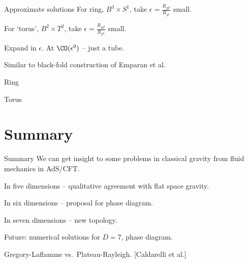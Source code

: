\documentclass{beamer}
\newcommand{\rref}[1]{\hfill \small{\color{darkgrey} [#1]}}
\begin{document}

\begin{frame}{Approximate solutions}
%
 For ring, $B^3 \times S^1$, take $\epsilon = \frac{R_{B^3}}{R_{S^1}}$ small.

 \vp For `torus', $B^2 \times T^2$, take $\epsilon = \frac{R_{B^2}}{R_{T^2}}$ small.

 \vp Expand in $\epsilon$. At $\CO(\epsilon^0)$ -- just a tube.

 \vp Similar to black-fold construction of Emparan et al.
%
\end{frame}


\begin{frame}{Ring}
%
 \begin{center}
   
 \end{center}
%
\end{frame}


\begin{frame}{Torus}
%
 \begin{center}
   
 \end{center}
%
\end{frame}

\section{Summary}


\begin{frame}{Summary}
%
 We can get insight to some problems in classical gravity from fluid mechanics in AdS/CFT.

 \vp In five dimensions -- qualitative agreement with flat space gravity.

 \vp In six dimensions -- proposal for phase diagram.

 \vp In seven dimensions -- new topology.

 \vp Future: numerical solutions for $D=7$, phase diagram.

 \vp Gregory-Laflamme vs.\ Plateau-Rayleigh. \rref{Caldarelli et al.}
%
\end{frame}


\end{document}
